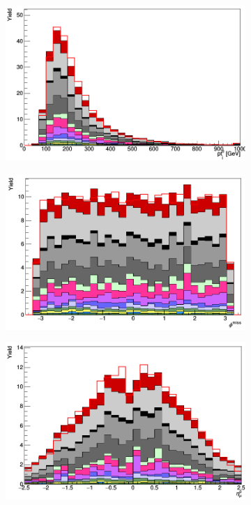 \begin{figure}[H]
\begin{subfigure}{.5\textwidth}
  \centering
  \includegraphics[width=.99\linewidth]{figs/featuresRNN/jet_pt_0}
\end{subfigure}%
\begin{subfigure}{.5\textwidth}
  \centering
  \includegraphics[width=.99\linewidth]{figs/featuresRNN/met_phi}
\end{subfigure}
\begin{subfigure}{.5\textwidth}
  \centering
  \includegraphics[width=.99\linewidth]{figs/featuresRNN/mu_eta_0}

\end{subfigure}
\end{figure}
